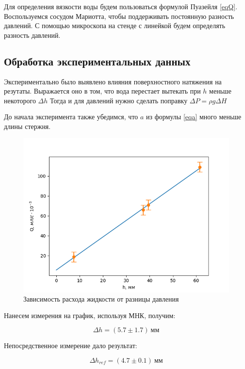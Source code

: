 \documentclass[a4paper]{article}
\begin{document}
Для определения вязкости воды будем пользоваться формулой Пуазейля \eqref{eqQ}.
Воспользуемся сосудом Мариотта, чтобы поддерживать постоянную разность давлений. 
С помощью микроскопа на стенде с линейкой будем определять разность давлений.

\subsection{Обработка экспериментальных данных}

Экспериментально было выявлено влияния поверхностного натяжения на резутаты.
Выражается оно в том, что вода перестает вытекать при $h$ меньше некоторого $\Delta h$
Тогда и для давлений нужно сделать поправку $\Delta P = \rho g \Delta H$

До начала эксперимента также убедимся, что $a$ из формулы \eqref{eqa} много меньше длины стержня.

\begin{figure}[h]
    \centering
    \includegraphics[scale=0.75]{graph_1.png}
    \caption{Зависимость расхода жидкости от разницы давления}
\end{figure}

Нанесем измерения на график, используя МНК, получим:

\begin{equation}
    \Delta h = (5.7 \pm 1.7) \ \text{мм}
\end{equation}

Непосредственное измерение дало результат:

\begin{equation}
    \Delta h_{ref} = (4.7 \pm 0.1) \ \text{мм}
\end{equation}
\end{document}

